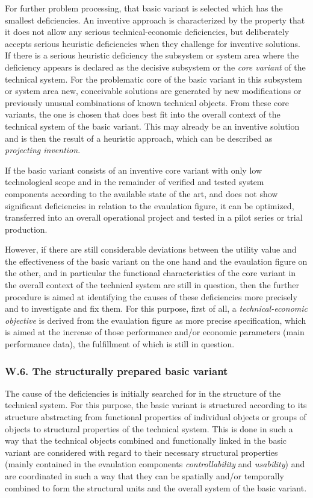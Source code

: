 \documentclass[11pt,a4paper]{article}
\begin{document}
For further problem processing, that basic variant is selected which has the
smallest deficiencies. An inventive approach is characterized by the property
that it does not allow any serious technical-economic deficiencies, but
deliberately accepts serious heuristic deficiencies when they challenge for
inventive solutions.  If there is a serious heuristic deficiency the subsystem
or system area where the deficiency appears is declared as the decisive
subsystem or the \emph{core variant} of the technical system. For the
problematic core of the basic variant in this subsystem or system area new,
conceivable solutions are generated by new modifications or previously unusual
combinations of known technical objects.  From these core variants, the one is
chosen that does best fit into the overall context of the technical system of
the basic variant. This may already be an inventive solution and is then the
result of a heuristic approach, which can be described as \emph{projecting
  invention}.

If the basic variant consists of an inventive core variant with only low
technological scope and in the remainder of verified and tested system
components according to the available state of the art, and does not show
significant deficiencies in relation to the evaulation figure, it can be
optimized, transferred into an overall operational project and tested in a
pilot series or trial production.

However, if there are still considerable deviations between the utility value
and the effectiveness of the basic variant on the one hand and the evaulation
figure on the other, and in particular the functional characteristics of the
core variant in the overall context of the technical system are still in
question, then the further procedure is aimed at identifying the causes of
these deficiencies more precisely and to investigate and fix them. For this
purpose, first of all, a \emph{technical-economic objective} is derived from
the evaulation figure as more precise specification, which is aimed at the
increase of those performance and/or economic parameters (main performance
data), the fulfillment of which is still in question.

\subsubsection*{W.6. The structurally prepared basic variant}

The cause of the deficiencies is initially searched for in the structure of
the technical system. For this purpose, the basic variant is structured
according to its structure abstracting from functional properties of
individual objects or groups of objects to structural properties of the
technical system. This is done in such a way that the technical objects
combined and functionally linked in the basic variant are considered with
regard to their necessary structural properties (mainly contained in the
evaulation components \emph{controllability} and \emph{usability}) and are
coordinated in such a way that they can be spatially and/or temporally
combined to form the structural units and the overall system of the basic
variant.
\end{document}
